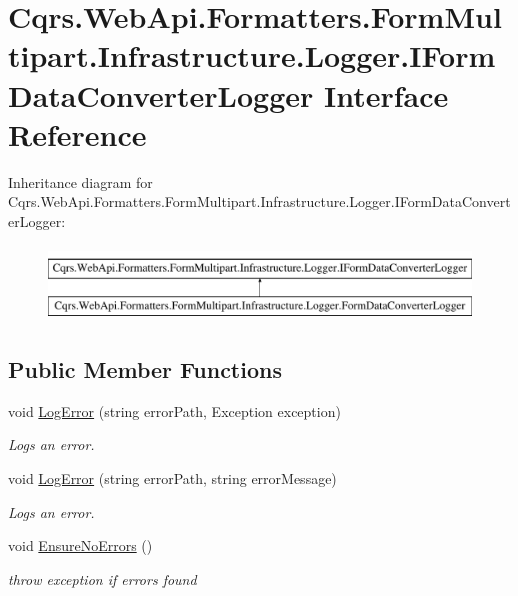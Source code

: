 \hypertarget{interfaceCqrs_1_1WebApi_1_1Formatters_1_1FormMultipart_1_1Infrastructure_1_1Logger_1_1IFormDataConverterLogger}{}\section{Cqrs.\+Web\+Api.\+Formatters.\+Form\+Multipart.\+Infrastructure.\+Logger.\+I\+Form\+Data\+Converter\+Logger Interface Reference}
\label{interfaceCqrs_1_1WebApi_1_1Formatters_1_1FormMultipart_1_1Infrastructure_1_1Logger_1_1IFormDataConverterLogger}
Inheritance diagram for Cqrs.\+Web\+Api.\+Formatters.\+Form\+Multipart.\+Infrastructure.\+Logger.\+I\+Form\+Data\+Converter\+Logger\+:\begin{figure}[H]
\begin{center}
\leavevmode
\includegraphics[height=2.000000cm]{interfaceCqrs_1_1WebApi_1_1Formatters_1_1FormMultipart_1_1Infrastructure_1_1Logger_1_1IFormDataConverterLogger}
\end{center}
\end{figure}
\subsection*{Public Member Functions}
\begin{DoxyCompactItemize}
\item 
void \hyperlink{interfaceCqrs_1_1WebApi_1_1Formatters_1_1FormMultipart_1_1Infrastructure_1_1Logger_1_1IFormDataConverterLogger_a7da0b7749a50f6fed2cb5ab0d8efef2a_a7da0b7749a50f6fed2cb5ab0d8efef2a}{Log\+Error} (string error\+Path, Exception exception)
\begin{DoxyCompactList}\small\item\em Logs an error. \end{DoxyCompactList}\item 
void \hyperlink{interfaceCqrs_1_1WebApi_1_1Formatters_1_1FormMultipart_1_1Infrastructure_1_1Logger_1_1IFormDataConverterLogger_a0067054a5f882d2687e8fd9f9ae38e9b_a0067054a5f882d2687e8fd9f9ae38e9b}{Log\+Error} (string error\+Path, string error\+Message)
\begin{DoxyCompactList}\small\item\em Logs an error. \end{DoxyCompactList}\item 
void \hyperlink{interfaceCqrs_1_1WebApi_1_1Formatters_1_1FormMultipart_1_1Infrastructure_1_1Logger_1_1IFormDataConverterLogger_a53cf31f01e5ceb5efcc8ed3d874c319a_a53cf31f01e5ceb5efcc8ed3d874c319a}{Ensure\+No\+Errors} ()
\begin{DoxyCompactList}\small\item\em throw exception if errors found \end{DoxyCompactList}\end{DoxyCompactItemize}


